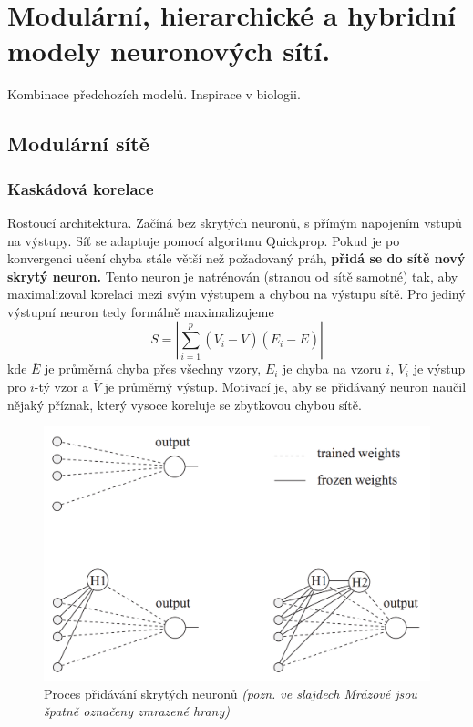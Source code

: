 \documentclass[11pt]{report} %
\numberwithin{equation}{section}
\begin{document}
\section{Modulární, hierarchické a hybridní modely neuronových sítí.}
Kombinace předchozích modelů. Inspirace v biologii.

\subsection{Modulární sítě}
\subsubsection{Kaskádová korelace}
Rostoucí architektura. Začíná bez skrytých neuronů, s přímým napojením vstupů na výstupy. Síť se adaptuje pomocí algoritmu Quickprop. Pokud je po konvergenci učení chyba stále větší než požadovaný práh, \textbf{přidá se do sítě nový skrytý neuron.} Tento neuron je natrénován (stranou od sítě samotné) tak, aby maximalizoval korelaci mezi svým výstupem a chybou na výstupu sítě. Pro jediný výstupní neuron tedy formálně maximalizujeme 
$$S = |\sum_{i=1}^{p}(V_i - \overline{V})(E_i - \overline{E})|$$
kde $\overline{E}$ je průměrná chyba přes všechny vzory, $E_i$ je chyba na vzoru $i$, $V_i$ je výstup pro $i$-tý vzor a $\overline{V}$ je průměrný výstup. Motivací je, aby se přidávaný neuron naučil nějaký příznak, který vysoce koreluje se zbytkovou chybou sítě.

\begin{figure}[H]
	\centering
	\includegraphics[scale=1]{img/cascade.png}
	\caption{Proces přidávání skrytých neuronů \textit{(pozn. ve slajdech Mrázové jsou špatně označeny zmrazené hrany)}}
\end{figure}
\end{document}
